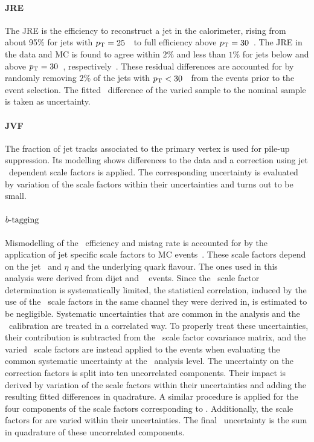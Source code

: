\paragraph{\gls{JRE}}\mbox{}
%
The \gls{JRE} is the efficiency to reconstruct a jet in the calorimeter, rising from about 95\% for jets with $p_\mathrm{T}=25$~\GeV\ to full efficiency above $p_\mathrm{T}=30$~\GeV.
%
The \gls{JRE} in the data and \gls{MC} is found to agree within $2\%$ and less than $1\%$ for jets below and above $p_\mathrm{T}=30$~\GeV, respectively~\cite{Aad:1409965}. 
%
These residual differences are accounted for by randomly removing $2\%$ of the jets with $p_\mathrm{T}< 30$~\GeV\ from the events prior to the event selection. 
%
The fitted \mt\ difference of the varied sample to the nominal sample is taken as uncertainty.
%
%
\paragraph{\gls{JVF}}\mbox{}
% 
The fraction of jet tracks associated to the primary vertex is used for pile-up suppression. 
%
Its modelling shows differences to the data and a correction using jet \pt\ dependent scale factors is applied. 
%
The corresponding uncertainty is evaluated by variation of the scale factors within their uncertainties and turns out to be small.
%
%
\paragraph{\boldmath$b\mbox{-tagging}$}\mbox{}
%
Mismodelling of the \btag\ efficiency and mistag rate is accounted for by the application of jet specific scale factors to \gls{MC} events~\cite{Aad:2015ydr}.
%
These scale factors depend on the jet \pt\ and $\eta$ and the underlying quark flavour. 
%
The ones used in this analysis were derived from dijet and \ttbarll~\cite{Aad:2015ydr} events. 
%
Since the \btag\ scale factor determination is systematically limited, the statistical correlation, induced by the use of the \ttbarll\ scale factors in the same channel they were derived in, is estimated to be negligible. 
%
Systematic uncertainties that are common in the analysis and the \btag\ calibration are treated in a correlated way. To properly treat these uncertainties, their contribution is subtracted from the \btag\ scale factor covariance matrix, and the varied \btag\ scale factors are instead applied to the events when evaluating the common systematic uncertainty at the \mt\ analysis level.
%
The uncertainty on the correction factors is split into ten uncorrelated components. 
%
Their impact is derived by variation of the scale factors within their uncertainties and adding the resulting fitted differences in quadrature. 
%
A similar procedure is applied for the four components of the scale factors corresponding to . 
%
Additionally, the scale factors for  are varied within their uncertainties. The final \btag\ uncertainty is the sum in quadrature of these uncorrelated components.
%
%
